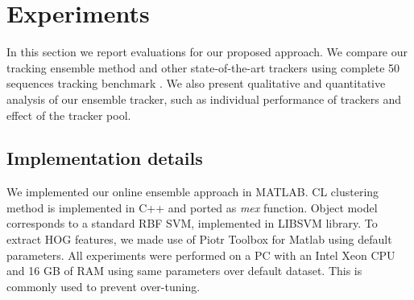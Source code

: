 \chapter{Experiments} %

\label{chapter4} %

\label{chapter::experiments}

In this section we report evaluations for our proposed approach. We compare our
tracking ensemble method and other state-of-the-art trackers using complete
50 sequences tracking benchmark \cite{Wu2013}. We also present qualitative and
quantitative analysis of our ensemble tracker, such as
individual performance of trackers and effect of the tracker pool.

\section{Implementation details}
We implemented our online ensemble approach in MATLAB. CL clustering method is
implemented in C++ and ported as \textit{mex} function. Object model corresponds
to a standard RBF SVM, implemented in LIBSVM library. To extract HOG features,
we made use of Piotr Toolbox for Matlab using default parameters. All
experiments were performed on a PC with an Intel Xeon CPU and 16 GB of RAM using
same parameters over default dataset. This is commonly used to prevent
over-tuning.

